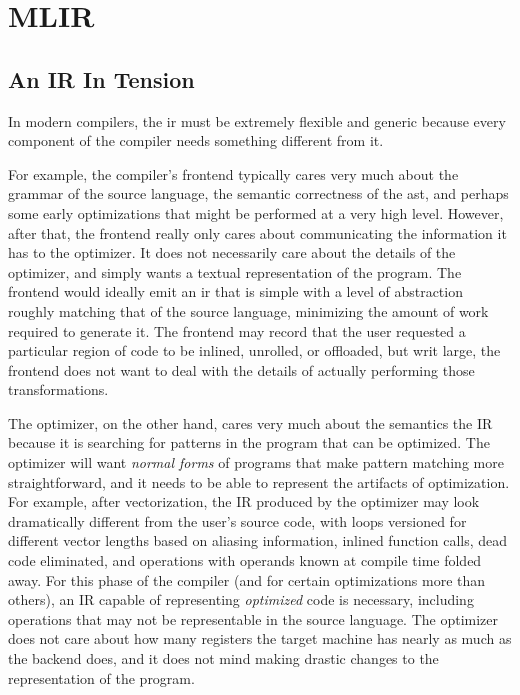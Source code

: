\section{MLIR}

\subsection{An IR In Tension}

In modern compilers, the \acrshort{ir} must be extremely flexible and generic
because every component of the compiler needs something different from it.

For example, the compiler's frontend typically cares very much about the
grammar of the source language, the semantic correctness of the \acrshort{ast},
and perhaps some early optimizations that might be performed at a very high level.
However, after that, the frontend really only cares about communicating the information
it has to the optimizer. It does not necessarily care about the details of the
optimizer, and simply wants a textual representation of the program.
The frontend would ideally emit an \acrshort{ir} that is simple with a level of abstraction
roughly matching that of the source language, minimizing the amount of work required to generate it.
The frontend may record that the user requested a particular region of code to
be inlined, unrolled, or offloaded, but writ large, the frontend does not want to deal with
the details of actually performing those transformations.

The optimizer, on the other hand, cares very much about the semantics the IR
because it is searching for patterns in the program that can be optimized.
The optimizer will want \textit{normal forms} of programs that make pattern matching
more straightforward, and it needs to be able to represent the artifacts of
optimization.
For example, after vectorization, the IR produced by the optimizer may look dramatically
different from the user's source code, with loops versioned for different vector lengths
based on aliasing information, inlined function calls, dead code eliminated, and operations
with operands known at compile time folded away.
For this phase of the compiler (and for certain optimizations more than others),
an IR capable of representing \textit{optimized} code is necessary, including
operations that may not be representable in the source language.
The optimizer does not care about how many registers the target machine has
nearly as much as the backend does, and it does not mind making drastic changes
to the representation of the program.

